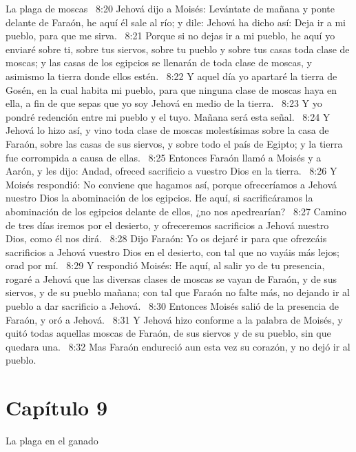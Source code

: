 La plaga de moscas  
8:20 Jehová dijo a Moisés: Levántate de mañana y ponte delante de Faraón, he aquí él sale al río; y dile: Jehová ha dicho así: Deja ir a mi pueblo, para que me sirva.  
8:21 Porque si no dejas ir a mi pueblo, he aquí yo enviaré sobre ti, sobre tus siervos, sobre tu pueblo y sobre tus casas toda clase de moscas; y las casas de los egipcios se llenarán de toda clase de moscas, y asimismo la tierra donde ellos estén.  
8:22 Y aquel día yo apartaré la tierra de Gosén, en la cual habita mi pueblo, para que ninguna clase de moscas haya en ella, a fin de que sepas que yo soy Jehová en medio de la tierra.  
8:23 Y yo pondré redención entre mi pueblo y el tuyo. Mañana será esta señal.  
8:24 Y Jehová lo hizo así, y vino toda clase de moscas molestísimas sobre la casa de Faraón, sobre las casas de sus siervos, y sobre todo el país de Egipto; y la tierra fue corrompida a causa de ellas.  
8:25 Entonces Faraón llamó a Moisés y a Aarón, y les dijo: Andad, ofreced sacrificio a vuestro Dios en la tierra.  
8:26 Y Moisés respondió: No conviene que hagamos así, porque ofreceríamos a Jehová nuestro Dios la abominación de los egipcios. He aquí, si sacrificáramos la abominación de los egipcios delante de ellos, ¿no nos apedrearían?  
8:27 Camino de tres días iremos por el desierto, y ofreceremos sacrificios a Jehová nuestro Dios, como él nos dirá.  
8:28 Dijo Faraón: Yo os dejaré ir para que ofrezcáis sacrificios a Jehová vuestro Dios en el desierto, con tal que no vayáis más lejos; orad por mí.  
8:29 Y respondió Moisés: He aquí, al salir yo de tu presencia, rogaré a Jehová que las diversas clases de moscas se vayan de Faraón, y de sus siervos, y de su pueblo mañana; con tal que Faraón no falte más, no dejando ir al pueblo a dar sacrificio a Jehová.  
8:30 Entonces Moisés salió de la presencia de Faraón, y oró a Jehová.  
8:31 Y Jehová hizo conforme a la palabra de Moisés, y quitó todas aquellas moscas de Faraón, de sus siervos y de su pueblo, sin que quedara una.  
8:32 Mas Faraón endureció aun esta vez su corazón, y no dejó ir al pueblo.  
\section*{Capítulo 9}
La plaga en el ganado  

